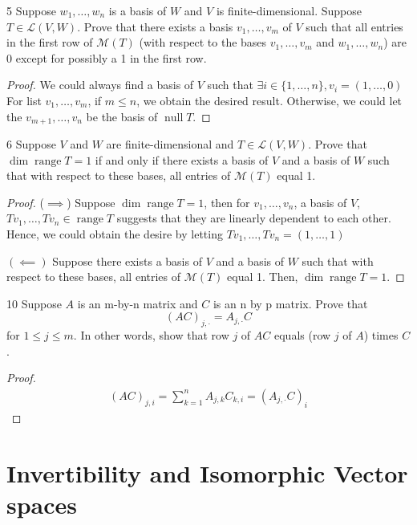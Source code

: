 \documentclass{article}
\newenvironment{problem}[1]{\begin{prob*}{#1}{}}{\end{prob*}}
\DeclareMathOperator{\Null}{null}
\DeclareMathOperator{\Range}{range}
\begin{document}
\begin{problem}{5}
Suppose $w_1, \ldots ,w_n$ is a basis of $W$ and $V$ is finite-dimensional. Suppose $T \in \mathcal{L}(V,W)$. Prove that there exists a basis $v_1, \ldots ,v_m$ of $V$ such that all entries in the first row of $\mathcal{M}(T)$ (with respect to the bases $v_1, \ldots ,v_m$ and $w_1, \ldots ,w_n$) are 0 except for possibly a 1 in the first row.
\end{problem}
\begin{proof}
	We could always find a basis of $V$ such that $\exists i \in \{1, \ldots ,n\}, v_i = (1, \ldots ,0)$
	For list $v_1, \ldots ,v_m$, if $m \le n$, we obtain the desired result. Otherwise, we could let the $v_{m+1}, \ldots , v_n$ be the basis of $\Null T$.
\end{proof}

\begin{problem}{6}
Suppose $V$ and $W$ are finite-dimensional and $T \in \mathcal{L}(V,W)$. Prove that $\operatorname{dim}\Range T = 1$ if and only if there exists a basis of $V$ and a basis of $W$ such that with respect to these bases, all entries of $\mathcal{M}(T)$ equal 1.
\end{problem}
\begin{proof}
	($\implies$) Suppose $\operatorname{dim}\Range T = 1$, then for $v_1, \ldots ,v_n$, a basis of $V$, $Tv_1, \ldots ,Tv_n \in \Range T$ suggests that they are linearly dependent to each other. Hence, we could obtain the desire by letting $Tv_1, \ldots ,Tv_n = (1, \ldots ,1)$

	$(\impliedby)$ Suppose there exists a basis of $V$ and a basis of $W$ such that with respect to these bases, all entries of $\mathcal{M}(T)$ equal 1. Then, $\operatorname{dim}\Range T = 1$.
\end{proof}

\begin{problem}{10}
Suppose $A$ is an m-by-n matrix and $C $ is an n by p matrix. Prove that \[
	(AC)_{j,\cdot} = A_{j, \cdot }C\]
for $1 \le j \le m$. In other words, show that row $j$ of $AC$ equals (row $j$ of $A$) times $C$.
\end{problem}
\begin{proof}
	\begin{align*}
		(AC)_{j,i} = \sum_{k=1}^n A_{j,k}C_{k,i} = (A_{j, \cdot}C)_{i}
	\end{align*}
\end{proof}

\newpage

\section{Invertibility and Isomorphic Vector spaces}
\end{document}
